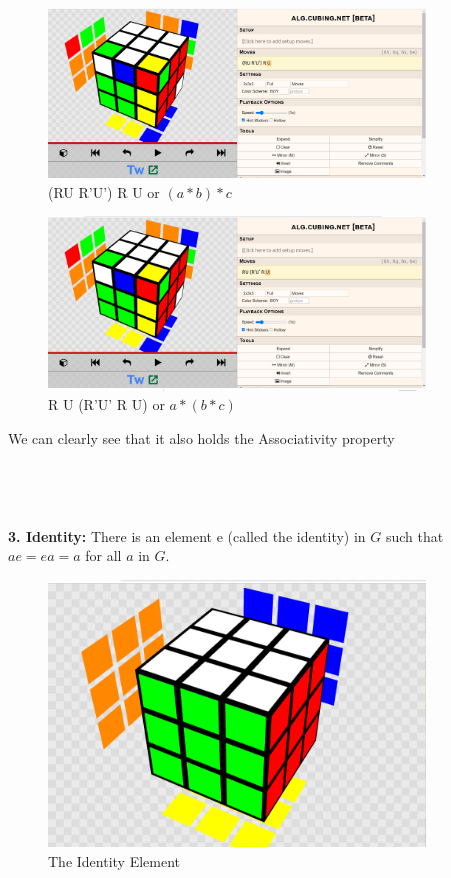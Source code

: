 \documentclass{article}
\begin{document}
\begin{center}
    \begin{figure}[h!]
    \centering
    \includegraphics[width = 10cm ]{Screenshot 2023-07-06 001036.png}
    \caption{(RU R'U') R U or $ (a * b)*c $}
    \label{(RU R'U') R U or $ (a * b)*c $}
\end{figure}
\begin{figure}[h!]
    \centering
    \includegraphics[width = 10cm ]{Screenshot 2023-07-06 001958.png}
    \caption{R U (R'U' R U) or $ a * (b *c) $}
    \label{(RU R'U') R U or $ (a * b)*c $}
\end{figure}
\end{center}
We can clearly see that it also holds the Associativity property\\\\\\\\\\
\textbf{3. Identity:} There is an element e (called the identity) in $G$ such that
$ae = ea = a$ for all $a$ in $G$.\\
\begin{figure}[h!]
    \centering
    \includegraphics[width = 10cm ]{Screenshot 2023-07-06 003851.png}
    \caption{The Identity Element}
    \label{(RU R'U') R U or $ (a * b)*c $}
\end{figure}
\end{document}
